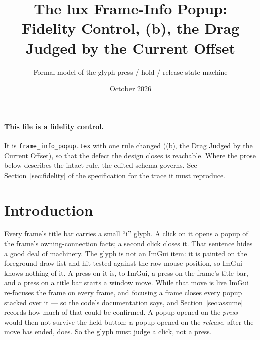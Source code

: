 \documentclass[a4paper,10pt,fleqn]{article}
\begin{document}
\title{The lux Frame-Info Popup: Fidelity Control, (b), the Drag Judged by the Current Offset}
\author{Formal model of the glyph press / hold / release state machine}
\date{October 2026}
\maketitle

\paragraph{This file is a fidelity control.}
It is \texttt{frame\_info\_popup.tex} with one rule changed ((b), the Drag Judged by the Current Offset), so that
the defect the design closes is reachable.  Where the prose below describes
the intact rule, the edited schema governs.  See Section~\ref{sec:fidelity} of
the specification for the trace it must reproduce.

\section{Introduction}

Every frame's title bar carries a small ``i'' glyph.  A click on it opens a
popup of the frame's owning-connection facts; a second click closes it.  That
sentence hides a good deal of machinery.  The glyph is not an ImGui item: it is
painted on the foreground draw list and hit-tested against the raw mouse
position, so ImGui knows nothing of it.  A press on it is, to ImGui, a press on
the frame's title bar, and a press on a title bar starts a window move.  While
that move is live ImGui re-focuses the frame on every frame, and focusing a
frame closes every popup stacked over it --- so the code's documentation says,
and Section~\ref{sec:assume} records how much of that could be confirmed.  A
popup opened on the \emph{press} would then not survive the held button; a
popup opened on the \emph{release}, after the move has ended, does.  So the glyph
must judge a click, not a press.
\end{document}
